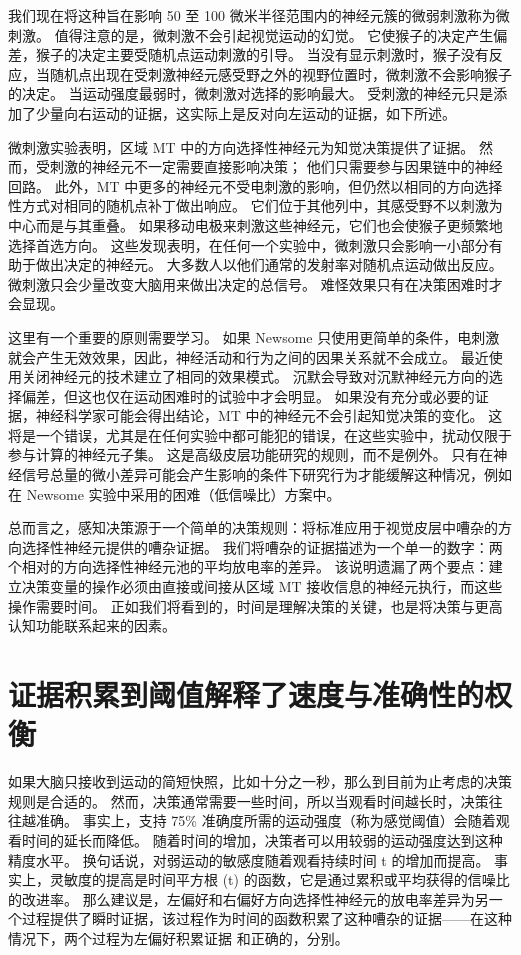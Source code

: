 我们现在将这种旨在影响 50 至 100 微米半径范围内的神经元簇的微弱刺激称为微刺激。 值得注意的是，微刺激不会引起视觉运动的幻觉。 它使猴子的决定产生偏差，猴子的决定主要受随机点运动刺激的引导。 当没有显示刺激时，猴子没有反应，当随机点出现在受刺激神经元感受野之外的视野位置时，微刺激不会影响猴子的决定。 当运动强度最弱时，微刺激对选择的影响最大。 受刺激的神经元只是添加了少量向右运动的证据，这实际上是反对向左运动的证据，如下所述。

微刺激实验表明，区域 MT 中的方向选择性神经元为知觉决策提供了证据。 然而，受刺激的神经元不一定需要直接影响决策； 他们只需要参与因果链中的神经回路。 此外，MT 中更多的神经元不受电刺激的影响，但仍然以相同的方向选择性方式对相同的随机点补丁做出响应。 它们位于其他列中，其感受野不以刺激为中心而是与其重叠。 如果移动电极来刺激这些神经元，它们也会使猴子更频繁地选择首选方向。 这些发现表明，在任何一个实验中，微刺激只会影响一小部分有助于做出决定的神经元。 大多数人以他们通常的发射率对随机点运动做出反应。 微刺激只会少量改变大脑用来做出决定的总信号。 难怪效果只有在决策困难时才会显现。

这里有一个重要的原则需要学习。 如果 Newsome 只使用更简单的条件，电刺激就会产生无效效果，因此，神经活动和行为之间的因果关系就不会成立。 最近使用关闭神经元的技术建立了相同的效果模式。 沉默会导致对沉默神经元方向的选择偏差，但这也仅在运动困难时的试验中才会明显。 如果没有充分或必要的证据，神经科学家可能会得出结论，MT 中的神经元不会引起知觉决策的变化。 这将是一个错误，尤其是在任何实验中都可能犯的错误，在这些实验中，扰动仅限于参与计算的神经元子集。 这是高级皮层功能研究的规则，而不是例外。 只有在神经信号总量的微小差异可能会产生影响的条件下研究行为才能缓解这种情况，例如在 Newsome 实验中采用的困难（低信噪比）方案中。

总而言之，感知决策源于一个简单的决策规则：将标准应用于视觉皮层中嘈杂的方向选择性神经元提供的嘈杂证据。 我们将嘈杂的证据描述为一个单一的数字：两个相对的方向选择性神经元池的平均放电率的差异。 该说明遗漏了两个要点：建立决策变量的操作必须由直接或间接从区域 MT 接收信息的神经元执行，而这些操作需要时间。 正如我们将看到的，时间是理解决策的关键，也是将决策与更高认知功能联系起来的因素。

\section{证据积累到阈值解释了速度与准确性的权衡}

如果大脑只接收到运动的简短快照，比如十分之一秒，那么到目前为止考虑的决策规则是合适的。 然而，决策通常需要一些时间，所以当观看时间越长时，决策往往越准确。 事实上，支持 75\% 准确度所需的运动强度（称为感觉阈值）会随着观看时间的延长而降低。 随着时间的增加，决策者可以用较弱的运动强度达到这种精度水平。 换句话说，对弱运动的敏感度随着观看持续时间 t 的增加而提高。 事实上，灵敏度的提高是时间平方根 (t) 的函数，它是通过累积或平均获得的信噪比的改进率。 那么建议是，左偏好和右偏好方向选择性神经元的放电率差异为另一个过程提供了瞬时证据，该过程作为时间的函数积累了这种嘈杂的证据——在这种情况下，两个过程为左偏好积累证据 和正确的，分别。

